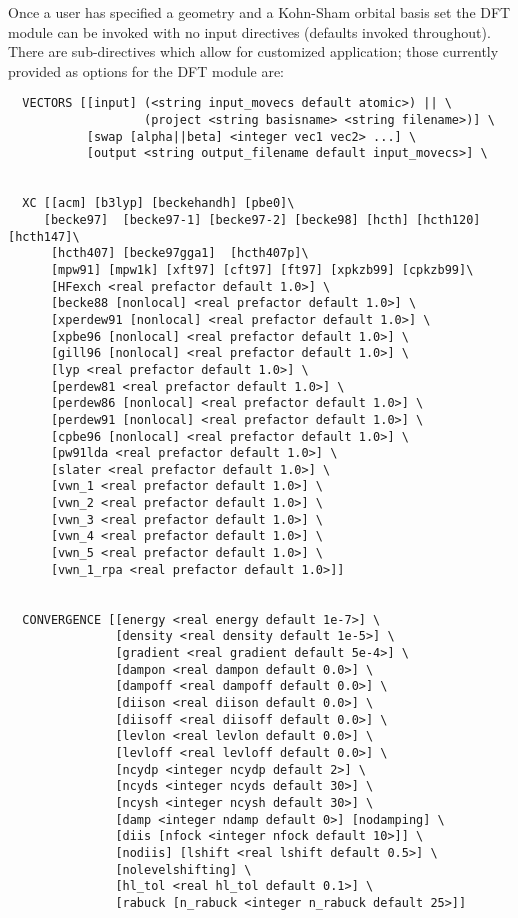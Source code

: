 Once a user has specified a geometry and a Kohn-Sham orbital basis set
the DFT module can be invoked with no input directives (defaults 
invoked throughout).  There are sub-directives which allow for 
customized application; those currently provided as options for 
the DFT module are:
\begin{verbatim}
  VECTORS [[input] (<string input_movecs default atomic>) || \
                   (project <string basisname> <string filename>)] \
           [swap [alpha||beta] <integer vec1 vec2> ...] \
           [output <string output_filename default input_movecs>] \


  XC [[acm] [b3lyp] [beckehandh] [pbe0]\
     [becke97]  [becke97-1] [becke97-2] [becke98] [hcth] [hcth120] [hcth147]\
      [hcth407] [becke97gga1]  [hcth407p]\
      [mpw91] [mpw1k] [xft97] [cft97] [ft97] [xpkzb99] [cpkzb99]\
      [HFexch <real prefactor default 1.0>] \
      [becke88 [nonlocal] <real prefactor default 1.0>] \
      [xperdew91 [nonlocal] <real prefactor default 1.0>] \
      [xpbe96 [nonlocal] <real prefactor default 1.0>] \
      [gill96 [nonlocal] <real prefactor default 1.0>] \
      [lyp <real prefactor default 1.0>] \
      [perdew81 <real prefactor default 1.0>] \
      [perdew86 [nonlocal] <real prefactor default 1.0>] \
      [perdew91 [nonlocal] <real prefactor default 1.0>] \
      [cpbe96 [nonlocal] <real prefactor default 1.0>] \
      [pw91lda <real prefactor default 1.0>] \
      [slater <real prefactor default 1.0>] \
      [vwn_1 <real prefactor default 1.0>] \
      [vwn_2 <real prefactor default 1.0>] \
      [vwn_3 <real prefactor default 1.0>] \
      [vwn_4 <real prefactor default 1.0>] \
      [vwn_5 <real prefactor default 1.0>] \
      [vwn_1_rpa <real prefactor default 1.0>]]


  CONVERGENCE [[energy <real energy default 1e-7>] \
               [density <real density default 1e-5>] \
               [gradient <real gradient default 5e-4>] \
               [dampon <real dampon default 0.0>] \
               [dampoff <real dampoff default 0.0>] \
               [diison <real diison default 0.0>] \
               [diisoff <real diisoff default 0.0>] \
               [levlon <real levlon default 0.0>] \
               [levloff <real levloff default 0.0>] \
               [ncydp <integer ncydp default 2>] \
               [ncyds <integer ncyds default 30>] \
               [ncysh <integer ncysh default 30>] \
               [damp <integer ndamp default 0>] [nodamping] \
               [diis [nfock <integer nfock default 10>]] \
               [nodiis] [lshift <real lshift default 0.5>] \
               [nolevelshifting] \
               [hl_tol <real hl_tol default 0.1>] \
               [rabuck [n_rabuck <integer n_rabuck default 25>]]



\end{verbatim}
